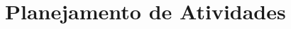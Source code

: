 \newcommand\T{\rule{0pt}{2.6ex}}       %
\newcommand\B{\rule[-1.2ex]{0pt}{0pt}} %

\chapter{\label{chap:planej}Planejamento de Atividades}

